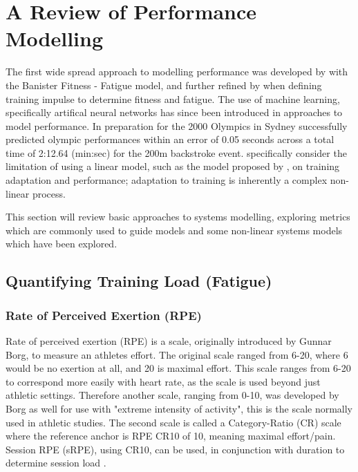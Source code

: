 \section{A Review of Performance Modelling}
The first wide spread approach to modelling performance was developed by \textcite{Bannister1976} with the Banister Fitness - Fatigue model, and further refined by \textcite{Morton1990} when defining training impulse to determine fitness and fatigue. The use of machine learning, specifically artifical neural networks has since been introduced in approaches to model performance. In preparation for the 2000 Olympics in Sydney \textcite{Edelmannnusser2002} successfully predicted olympic performances within an error of 0.05 seconds across a total time of 2:12.64 (min:sec) for the 200m backstroke event. \textcite{Edelmannnusser2002} specifically consider the limitation of using a linear model, such as the model proposed by \textcite{Bannister1976}, on training adaptation and performance; adaptation to training is inherently a complex non-linear process. 

This section will review basic approaches to systems modelling, exploring metrics which are commonly used to guide models and some non-linear systems models which have been explored. 

\subsection{Quantifying Training Load (Fatigue)}
\subsubsection{Rate of Perceived Exertion (RPE)} \label{subsub:rpe}
Rate of perceived exertion (RPE) is a scale, originally introduced by Gunnar Borg, to measure an athletes effort. The original scale ranged from 6-20, where 6 would be no exertion at all, and 20 is maximal effort. This scale ranges from 6-20 to correspond more easily with heart rate, as the scale is used beyond just athletic settings. Therefore another scale, ranging from 0-10, was developed by Borg as well for use with "extreme intensity of activity", this is the scale normally used in athletic studies. The second scale is called a Category-Ratio (CR) scale where the reference anchor is RPE CR10 of 10, meaning maximal effort/pain. Session RPE (sRPE), using CR10, can be used, in conjunction with duration to determine session load \cite{Williams2017}.


